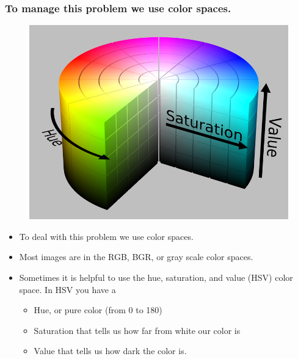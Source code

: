\documentclass{beamer}
\begin{document}
\begin{frame}
\frametitle{To manage this problem we use color spaces.}
 \begin{figure}
     \includegraphics[width=0.4\linewidth]{hsv.png}
 \end{figure}
\begin{itemize}
\item To deal with this problem we use color spaces. 
\item Most images are in the RGB, BGR, or gray scale color spaces.
\item Sometimes it is helpful to use the hue, saturation, and value (HSV)
color space. In HSV you have a 
\begin{itemize}
\item Hue, or pure color (from 0 to 180) 
\item Saturation that tells us how far from white our color is
\item Value that tells us how dark the color is.
\end{itemize}
\end{itemize}
\end{frame}
\end{document}
